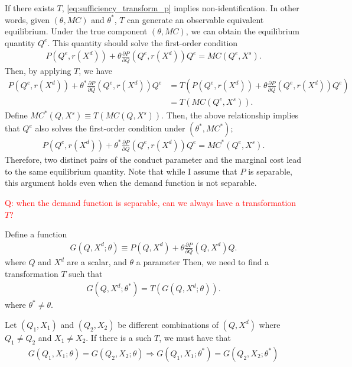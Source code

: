 \documentclass[11pt, a4paper]{article}
\theoremstyle{remark}
\begin{document}
If there exists $T$, \eqref{eq:sufficiency_transform_p} implies non-identification.
In other words, given $(\theta, MC)$ and $\theta^{*}$, $T$ can generate an observable equivalent equilibrium.
Under the true component $(\theta, MC)$, we can obtain the equilibrium quantity $Q^{e}$.
This quantity should solve the first-order condition 
\begin{align}
    P(Q^e, r(X^d)) + \theta \frac{\partial P}{\partial Q}(Q^e, r(X^d)) Q^e = MC(Q^e, X^{s}).
\end{align}
Then, by applying $T$, we have
\begin{align}
    P(Q^e, r(X^d)) + \theta^{*} \frac{\partial P}{\partial Q}(Q^e, r(X^d)) Q^e 
    & = T\left(P(Q^e, r(X^d)) + \theta \frac{\partial P}{\partial Q}(Q^e, r(X^d)) Q^e\right) \\
    &= T( MC(Q^e, X^{s})).
\end{align}
Define $MC^{*}(Q, X^{s}) \equiv T(MC(Q, X^{s}))$.
Then, the above relationship implies that $Q^{e}$ also solves the first-order condition under $(\theta^{*}, MC^{*})$;
\begin{align}
    P(Q^e, r(X^d)) + \theta^{*} \frac{\partial P}{\partial Q}(Q^e, r(X^d)) Q^e = MC^{*}(Q^e, X^{s}).
\end{align}
Therefore, two distinct pairs of the conduct parameter and the marginal cost lead to the same equilibrium quantity.
Note that while I assume that $P$ is separable, this argument holds even when the demand function is not separable.


\textcolor{red}{Q: when the demand function is separable, can we always have a transformation $T$? }

Define a function
\begin{align}
    G(Q, X^{d}; \theta) \equiv P(Q, X^d) + \theta \frac{\partial P}{\partial Q}(Q, X^d) Q. 
\end{align}
where $Q$ and $X^{d}$ are a scalar, and  $\theta$ a parameter 
Then, we need to find a transformation $T$ such that
\begin{align}
    G(Q, X^{d}; \theta^{*}) = T(G(Q, X^{d}; \theta)).
\end{align}
where $\theta^{*} \ne \theta$.

Let $(Q_1, X_1)$ and $(Q_2, X_2)$ be different combinations of $(Q,X^{d})$ where $Q_1 \ne Q_2$ and $X_1 \ne X_2$.
If there is a such $T$, we must have that
\begin{align}
    G(Q_1, X_1; \theta) = G(Q_2, X_2; \theta) \Longrightarrow G(Q_1, X_1; \theta^{*}) = G(Q_2, X_2; \theta^{*}) \label{eq:existence_transformation}
\end{align}
\end{document}
